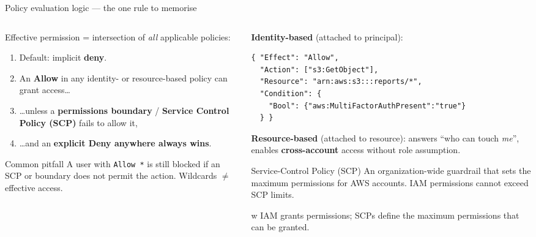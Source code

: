 \documentclass[aspectratio=169,10pt]{beamer}
\newcommand{\term}[1]{{\color{awsink}\textbf{#1}}}
\begin{document}
\begin{frame}[fragile]{Policy evaluation logic --- the one rule to memorise}
  \begin{columns}[T]
    \begin{column}{0.5\textwidth}\small
      Effective permission = intersection of \emph{all} applicable policies:
      \begin{enumerate}\setlength\itemsep{1pt}
        \item Default: implicit \term{deny}.
        \item An \term{Allow} in any identity- or resource-based policy can grant access\dots
        \item \dots unless a \term{permissions boundary} / \term{Service Control Policy (SCP)} fails to allow it,
        \item \dots and an \term{explicit Deny anywhere always wins}.
      \end{enumerate}
      \vspace{0.4em}
      \begin{alertblock}{\footnotesize Common pitfall}
        \footnotesize A user with \texttt{Allow *} is still blocked if an SCP or boundary
        does not permit the action. Wildcards $\neq$ effective access.
      \end{alertblock}
    \end{column}
    \begin{column}{0.5\textwidth}
      \scriptsize\textbf{Identity-based} (attached to principal):
      \begin{lstlisting}
{ "Effect": "Allow",
  "Action": ["s3:GetObject"],
  "Resource": "arn:aws:s3:::reports/*",
  "Condition": {
    "Bool": {"aws:MultiFactorAuthPresent":"true"}
  } }
      \end{lstlisting}
      \textbf{Resource-based} (attached to resource): answers ``who can touch \emph{me}'',
      enables \term{cross-account} access without role assumption.

      \begin{block}{\footnotesize Service-Control Policy (SCP)}
        \footnotesize An organization-wide guardrail that sets the maximum permissions for AWS accounts. IAM permissions cannot exceed SCP limits.
       
       w IAM grants permissions; SCPs define the maximum permissions that can be granted.
      \end{block}
    \end{column}
    

  \end{columns}

\end{frame}
\end{document}
